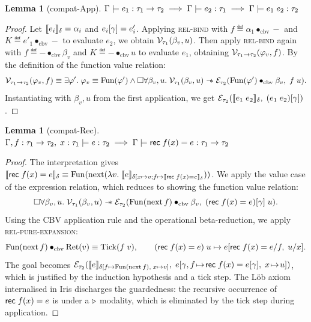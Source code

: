 \documentclass{article}
\theoremstyle{definition}
\theoremstyle{plain}
\newtheorem{lemma}[theorem]{Lemma}
\theoremstyle{remark}
\newcommand{\redu}{\mapsto}
\newcommand{\gRet}{\mathrm{Ret}}
\newcommand{\gFun}{\mathrm{Fun}}
\newcommand{\Tick}{\mathrm{Tick}}
\DeclareMathOperator*{\Next}{\mathrm{next}}
\newcommand{\cbvap}{\bullet_{\text{cbv}}}
\newcommand{\recval}[3]{\syn{rec}\;#1(#2)=#3}
\begin{document}
\begin{lemma}[compat-App]
  \( \displaystyle
  {\Gamma}\models{e_1}\mathrel{:}{\tau_1\to\tau_2} \implies
  {\Gamma}\models{e_2}\mathrel{:}{\tau_1} \implies
  {\Gamma}\models{e_1\;e_2}\mathrel{:}{\tau_2} \)
\end{lemma}
\begin{proof}
  Let \(\llbracket {e_i} \rrbracket_\delta = \alpha_i\) and \(e_i[\gamma] = e'_i\).
  Applying \textsc{rel-bind} with
  \(f \eqdef \alpha_1\cbvap - \) and \(K \eqdef e'_1\cbvap -\) to evaluate
  \(e_2\), we obtain \(\mathcal{V}_{\tau_1}(\beta_v,u)\).
  Then apply \textsc{rel-bind} again with
  \(f \eqdef - \cbvap {\beta_v}\) and \(K \eqdef - \cbvap {u}\) to evaluate
  \(e_1\), obtaining \(\mathcal{V}_{\tau_1\to\tau_2}(\varphi_v,f)\).
  By the definition of the function value relation:
  \[
  \mathcal{V}_{\type_1\to\type_2}(\varphi_v,f) \equiv
  \exists \varphi'.\; \varphi_v \equiv \gFun(\varphi') \land
  \Box\forall \beta_v,u.\;
    \mathcal{V}_{\type_1}(\beta_v,u) \wand
    \mathcal{E}_{\type_2}(\gFun(\varphi')\cbvap\beta_v,\;
      \eapp{f}{u}).
  \]
  Instantiating with \(\beta_v,u\) from the first application, we get
  \(\mathcal{E}_{\tau_2}(\llbracket {e_1\;e_2} \rrbracket_\delta,\; (e_1\;e_2)[\gamma])\).
\end{proof}

\begin{lemma}[compat-Rec]
  \( \displaystyle
  \typedSem{\Gamma,f:\type_1\to\type_2,\;x:\type_1}{e}{\type_2} \implies
  \typedSem{\Gamma}{\recval{f}{x}{e}}{\type_1\to\type_2} \)
\end{lemma}
\begin{proof}
  The interpretation gives
  \(\sem{\recval{f}{x}{e}}_\senv \equiv
  \gFun(\Next(\lambda v.\; \sem{e}_{\senv[x \mapsto v; f\mapsto \sem{\recval{f}{x}{e}}_\senv}))\).
  We apply the value case of the expression relation, which reduces to
  showing the function value relation:
  \[
  \Box\forall \beta_v,u.\;
    \mathcal{V}_{\type_1}(\beta_v,u) \wand
    \mathcal{E}_{\type_2}(
      \gFun(\Next f)\cbvap\beta_v,\;
      \eapp{(\recval{f}{x}{e})[\env]}{u}).
  \]
  Using the CBV application rule and the operational beta-reduction,
  we apply \textsc{rel-pure-expansion}:
  \[
  \gFun(\Next f)\cbvap\gRet(v) \equiv \Tick(f\;v),
  \qquad
  (\recval{f}{x}{e})\;u \redu e[\recval{f}{x}{e}/f,\;u/x].
  \]
  The goal becomes
  \(\mathcal{E}_{\type_2}(\sem{e}_{\senv[f\mapsto\gFun(\Next f),\;x\mapsto v]},\;
    e[\env,f\!\mapsto\!\recval{f}{x}{e}[\env],\;x\!\mapsto\!u])\),
  which is justified by the induction hypothesis and a tick step.
  The Löb axiom internalised in Iris discharges the guardedness:
  the recursive occurrence of \(\recval{f}{x}{e}\) is under a \(\mathop{\triangleright}\)
  modality, which is eliminated by the tick step during application.
\end{proof}
\end{document}
